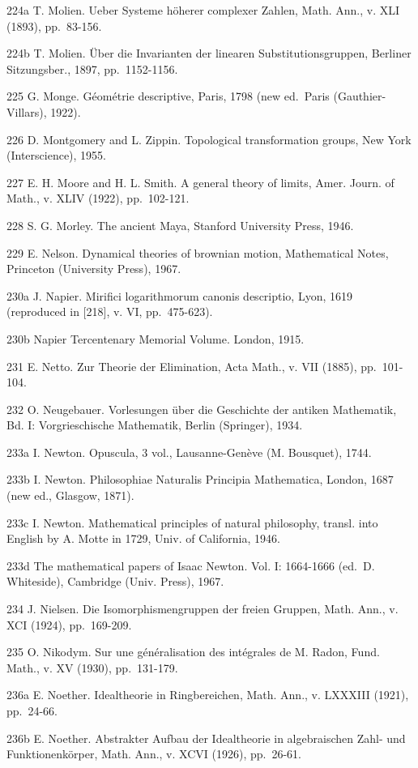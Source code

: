 224a T. Molien. Ueber Systeme höherer complexer Zahlen, Math. Ann., v. XLI (1893), pp.~83-156.

224b T. Molien. Über die Invarianten der linearen Substitutionsgruppen, Berliner Sitzungsber., 1897, pp.~1152-1156.

225 G. Monge. Géométrie descriptive, Paris, 1798 (new ed.~Paris (Gauthier-Villars), 1922).

226 D. Montgomery and L. Zippin. Topological transformation groups, New York (Interscience), 1955.

227 E. H. Moore and H. L. Smith. A general theory of limits, Amer. Journ. of Math., v. XLIV (1922), pp.~102-121.

228 S. G. Morley. The ancient Maya, Stanford University Press, 1946.

229 E. Nelson. Dynamical theories of brownian motion, Mathematical Notes, Princeton (University Press), 1967.

230a J. Napier. Mirifici logarithmorum canonis descriptio, Lyon, 1619 (reproduced in {[}218{]}, v. VI, pp.~475-623).

230b Napier Tercentenary Memorial Volume. London, 1915.

231 E. Netto. Zur Theorie der Elimination, Acta Math., v. VII (1885), pp.~101-104.

232 O. Neugebauer. Vorlesungen über die Geschichte der antiken Mathematik, Bd. I: Vorgrieschische Mathematik, Berlin (Springer), 1934.

233a I. Newton. Opuscula, 3 vol., Lausanne-Genève (M. Bousquet), 1744.

233b I. Newton. Philosophiae Naturalis Principia Mathematica, London, 1687 (new ed., Glasgow, 1871).

233c I. Newton. Mathematical principles of natural philosophy, transl. into English by A. Motte in 1729, Univ. of California, 1946.

233d The mathematical papers of Isaac Newton. Vol. I: 1664-1666 (ed.~D. Whiteside), Cambridge (Univ. Press), 1967.

234 J. Nielsen. Die Isomorphismengruppen der freien Gruppen, Math. Ann., v. XCI (1924), pp.~169-209.

235 O. Nikodym. Sur une généralisation des intégrales de M. Radon, Fund. Math., v. XV (1930), pp.~131-179.

236a E. Noether. Idealtheorie in Ringbereichen, Math. Ann., v. LXXXIII (1921), pp.~24-66.

236b E. Noether. Abstrakter Aufbau der Idealtheorie in algebraischen Zahl- und Funktionenkörper, Math. Ann., v. XCVI (1926), pp.~26-61.

